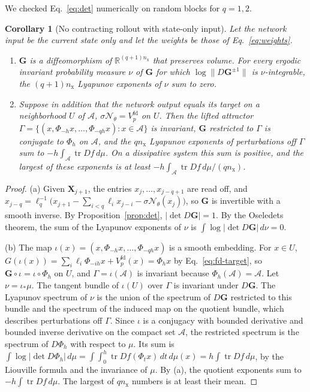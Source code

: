 \documentclass[11pt]{article}
\newtheorem{corollary}{Corollary}
\theoremstyle{definition}
\theoremstyle{remark}
\newcommand{\R}{\mathbb{R}}
\newcommand{\Aset}{\mathcal{A}}
\newcommand{\Net}{\mathcal{N}_\theta}
\newcommand{\Tr}{\operatorname{tr}}
\newcommand{\bX}{\mathbf{X}}
\newcommand{\bG}{\mathbf{G}}
\begin{document}
We checked Eq.~\eqref{eq:det} numerically on random blocks for $q = 1, 2$.

\begin{corollary}[No contracting rollout with state-only input]\label{cor:lyap}
Let the network input be the current state only and let the weights be those of Eq.~\eqref{eq:weights}.
\begin{enumerate}[label=(\alph*)]
\item $\bG$ is a diffeomorphism of $\R^{(q+1)n_{\mathrm x}}$ that preserves volume. For every ergodic invariant probability measure $\nu$ of $\bG$ for which $\log\|D\bG^{\pm1}\|$ is $\nu$-integrable, the $(q+1)n_{\mathrm x}$ Lyapunov exponents of $\nu$ sum to zero.
\item Suppose in addition that the network output equals its target on a neighborhood $U$ of $\Aset$, $\sigma\Net = V_p^{\mathrm{fd}}$ on $U$. Then the lifted attractor $\Gamma = \{(x, \Phi_{-h}x, \dots, \Phi_{-qh}x) : x \in \Aset\}$ is invariant, $\bG$ restricted to $\Gamma$ is conjugate to $\Phi_h$ on $\Aset$, and the $qn_{\mathrm x}$ Lyapunov exponents of perturbations off $\Gamma$ sum to $-h\int_\Aset\Tr Df\,d\mu$. On a dissipative system this sum is positive, and the largest of these exponents is at least $-h\int_\Aset\Tr Df\,d\mu/(qn_{\mathrm x})$.
\end{enumerate}
\end{corollary}

\begin{proof}
(a) Given $\bX_{j+1}$, the entries $x_j, \dots, x_{j-q+1}$ are read off, and $x_{j-q} = \ell_q^{-1}\big(x_{j+1} - \sum_{i<q}\ell_ix_{j-i} - \sigma\Net(x_j)\big)$, so $\bG$ is invertible with a smooth inverse.
By Proposition~\ref{prop:det}, $|\det D\bG| = 1$.
By the Oseledets theorem, the sum of the Lyapunov exponents of $\nu$ is $\int\log|\det D\bG|\,d\nu = 0$.

(b) The map $\iota(x) = (x, \Phi_{-h}x, \dots, \Phi_{-qh}x)$ is a smooth embedding.
For $x \in U$, $G(\iota(x)) = \sum_i\ell_i\Phi_{-ih}x + V_p^{\mathrm{fd}}(x) = \Phi_hx$ by Eq.~\eqref{eq:fd-target}, so $\bG\circ\iota = \iota\circ\Phi_h$ on $U$, and $\Gamma = \iota(\Aset)$ is invariant because $\Phi_h(\Aset) = \Aset$.
Let $\nu = \iota_\ast\mu$.
The tangent bundle of $\iota(U)$ over $\Gamma$ is invariant under $D\bG$.
The Lyapunov spectrum of $\nu$ is the union of the spectrum of $D\bG$ restricted to this bundle and the spectrum of the induced map on the quotient bundle, which describes perturbations off $\Gamma$.
Since $\iota$ is a conjugacy with bounded derivative and bounded inverse derivative on the compact set $\Aset$, the restricted spectrum is the spectrum of $D\Phi_h$ with respect to $\mu$.
Its sum is $\int\log|\det D\Phi_h|\,d\mu = \int\int_0^h\Tr Df(\Phi_tx)\,dt\,d\mu(x) = h\int\Tr Df\,d\mu$, by the Liouville formula and the invariance of $\mu$.
By (a), the quotient exponents sum to $-h\int\Tr Df\,d\mu$.
The largest of $qn_{\mathrm x}$ numbers is at least their mean.
\end{proof}
\end{document}

